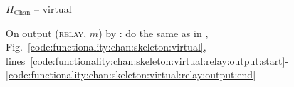 \begin{figure}[H]
\begin{protocolbox}{$\Pi_{\mathrm{Chan}}$ -- virtual}
\begin{algorithmic}[1]
      \State On output (\textsc{relay}, $m$) by \charlie:
      \Indent
        \State do the same as in \fchan,
        Fig.~\ref{code:functionality:chan:skeleton:virtual},
        lines~\ref{code:functionality:chan:skeleton:virtual:relay:output:start}-\ref{code:functionality:chan:skeleton:virtual:relay:output:end}
      \EndIndent
    \end{algorithmic}
  \end{protocolbox}
  \caption{}
  \label{code:protocol:chan:skeleton:virtual}
\end{figure}
